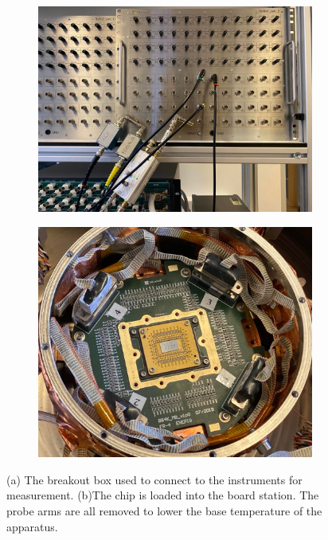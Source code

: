 \begin{figure}
    \centering
    \begin{subfigure}[b]{0.51\textwidth}
         \centering
         \includegraphics[width=\textwidth]{Pic/4KBoB.jpg}
         \caption{}
         \label{TaNWonchip}
     \end{subfigure}
     \hfill
     \begin{subfigure}[b]{0.45\textwidth}
         \centering
         \includegraphics[width=\textwidth]{Pic/Chipin4K.jpg}
         \caption{}
         \label{fig:three sin x}
     \end{subfigure}
    \caption{(a) The breakout box used to connect to the instruments for measurement. (b)The chip is loaded into the board station. The probe arms are all removed to lower the base temperature of the apparatus.}
    \label{fig:my_label}
\end{figure}

